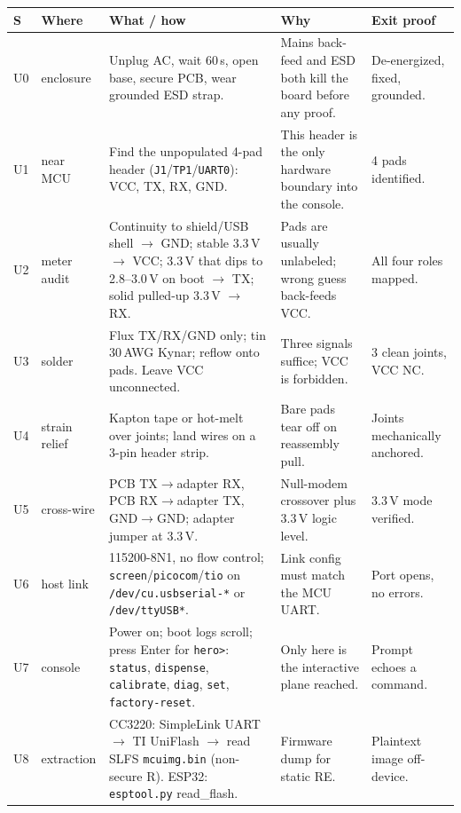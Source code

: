\documentclass[10pt]{article}
\begin{document}
\begin{center}\scriptsize
\begin{tabular}{|L{0.32in}|L{0.95in}|L{1.9in}|L{1.5in}|L{1.25in}|}
\hline
\textbf{S} & \textbf{Where} & \textbf{What / how} & \textbf{Why} & \textbf{Exit proof} \\
\hline
U0 & enclosure & Unplug AC, wait 60\,s, open base, secure PCB, wear grounded ESD strap. & Mains back-feed and ESD both kill the board before any proof. & De-energized, fixed, grounded. \\
\hline
U1 & near MCU & Find the unpopulated 4-pad header (\texttt{J1}/\texttt{TP1}/\texttt{UART0}): VCC, TX, RX, GND. & This header is the only hardware boundary into the console. & 4 pads identified. \\
\hline
U2 & meter audit & Continuity to shield/USB shell $\rightarrow$ GND; stable 3.3\,V $\rightarrow$ VCC; 3.3\,V that dips to 2.8--3.0\,V on boot $\rightarrow$ TX; solid pulled-up 3.3\,V $\rightarrow$ RX. & Pads are usually unlabeled; wrong guess back-feeds VCC. & All four roles mapped. \\
\hline
U3 & solder & Flux TX/RX/GND only; tin 30\,AWG Kynar; reflow onto pads. Leave VCC unconnected. & Three signals suffice; VCC is forbidden. & 3 clean joints, VCC NC. \\
\hline
U4 & strain relief & Kapton tape or hot-melt over joints; land wires on a 3-pin header strip. & Bare pads tear off on reassembly pull. & Joints mechanically anchored. \\
\hline
U5 & cross-wire & PCB TX$\rightarrow$adapter RX, PCB RX$\rightarrow$adapter TX, GND$\rightarrow$GND; adapter jumper at 3.3\,V. & Null-modem crossover plus 3.3\,V logic level. & 3.3\,V mode verified. \\
\hline
U6 & host link & 115200-8N1, no flow control; \texttt{screen}/\texttt{picocom}/\texttt{tio} on \texttt{/dev/cu.usbserial-*} or \texttt{/dev/ttyUSB*}. & Link config must match the MCU UART. & Port opens, no errors. \\
\hline
U7 & console & Power on; boot logs scroll; press Enter for \texttt{hero>}: \texttt{status}, \texttt{dispense}, \texttt{calibrate}, \texttt{diag}, \texttt{set}, \texttt{factory-reset}. & Only here is the interactive plane reached. & Prompt echoes a command. \\
\hline
U8 & extraction & CC3220: SimpleLink UART $\rightarrow$ TI UniFlash $\rightarrow$ read SLFS \texttt{mcuimg.bin} (non-secure R). ESP32: \texttt{esptool.py} read\_flash. & Firmware dump for static RE. & Plaintext image off-device. \\
\hline
\end{tabular}
\end{center}
\end{document}
